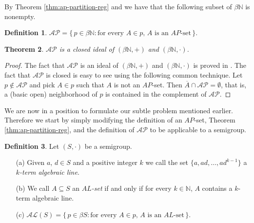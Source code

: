 \documentclass[12pt,showtrims]{memoir}
\theoremstyle{plain}
\newtheorem{thm}{Theorem}[section]
\theoremstyle{definition}
\newtheorem{defn}[thm]{Definition}
\newcommand{\bbN}{\mathbb{N}}
\newcommand{\AP}{\mathcal{AP}}
\newcommand{\AL}{\mathcal{AL}}
\begin{document}
By Theorem \ref{thm:ap-partition-reg} and \cite[Theorem 3.11]{Hindman:1998fk} we have that the following subset of $\beta \bbN$ is nonempty.

\begin{defn}
  $\AP = \{\, p \in \beta \bbN : \mbox{for every $A \in p$, $A$ is an $AP$-set} \,\}.$
\end{defn}

\begin{thm}
  $\AP$ is a closed ideal of $(\beta \bbN, +)$ and $(\beta \bbN, \cdot)$.
\end{thm}
\begin{proof}
  The fact that $\AP$ is an ideal of $(\beta \bbN, +)$ and $(\beta \bbN, \cdot)$ is proved in \cite[Theorem 14.5]{Hindman:1998fk}. 
  The fact that $\AP$ is closed is easy to see using the following common technique.
  Let $p \not\in \AP$ and pick $A \in p$ such that $A$ is not an $AP$-set.
  Then $\overline{A} \cap \AP = \emptyset$, that is, a (basic open) neighborhood of $p$ is contained in the complement of $\AP$.
\end{proof}

We are now in a position to formulate our subtle problem mentioned earlier.
Therefore we start by simply modifying the definition of an $AP$-set, Theorem \ref{thm:ap-partition-reg}, and the definition of $\AP$ to be applicable to a semigroup.

\begin{defn}
  Let $(S, \cdot)$ be a semigroup.
  \begin{itemize}
    \item[(a)] Given $a$, $d \in S$ and a positive integer $k$ we call the set $\{a, ad, \ldots, ad^{k-1}\}$ a \emph{$k$-term algebraic line}. 

    \item[(b)] We call $A \subseteq S$ an \emph{$AL$-set} if and only if for every $k \in \bbN$, $A$ contains a $k$-term algebraic line.

    \item[(c)] $\AL(S) = \{\, p \in \beta S : \mbox{for every $A \in p$, $A$ is an $AL$-set} \,\}$.
  \end{itemize}
\end{defn}
\end{document}
